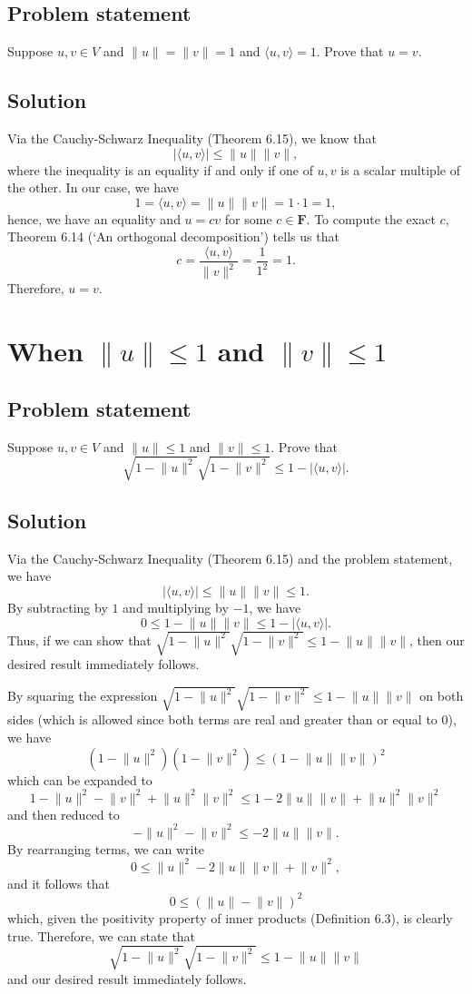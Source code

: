 \documentclass{article}
\providecommand{\abs}[1]{\lvert#1\rvert} \providecommand{\norm}[1]{\lVert#1\rVert}
\begin{document}
\subsection*{Problem statement}
Suppose $u,v\in V$ and $\norm{u}=\norm{v}=1$ and $\langle u,v\rangle=1$. 
Prove that $u=v$.

\subsection*{Solution}
Via the Cauchy-Schwarz Inequality (Theorem 6.15), we know that
\[\abs{\langle u,v\rangle}\leq\norm{u}\norm{v},\]
where the inequality is an equality if and only if one of $u,v$ is a scalar multiple of the other. 
In our case, we have
\[1=\langle u,v\rangle = \norm{u}\norm{v}=1\cdot 1=1,\]
hence, we have an equality and $u=cv$ for some $c\in\mathbf{F}$. 
To compute the exact $c$, Theorem 6.14 (`An orthogonal decomposition') tells us that 
\[c=\frac{\langle u,v\rangle}{\norm{v}^2}=\frac{1}{1^2}=1.\]
Therefore, $u=v$.

\clearpage

\section{When $\norm{u}\leq 1$ and $\norm{v}\leq 1$}
\subsection*{Problem statement}
Suppose $u,v\in V$ and $\norm{u}\leq 1$ and $\norm{v}\leq 1$. 
Prove that
\[\sqrt{1-\norm{u}^2}\sqrt{1-\norm{v}^2}\leq 1-\abs{\langle u,v \rangle}.\]

\subsection*{Solution}
Via the Cauchy-Schwarz Inequality (Theorem 6.15) and the problem statement, we have
\[\abs{\langle u,v\rangle}\leq \norm{u}\norm{v}\leq 1.\]
By subtracting by $1$ and multiplying by $-1$, we have
\[0\leq 1-\norm{u}\norm{v}\leq 1- \abs{\langle u,v\rangle}.\]
Thus, if we can show that $\sqrt{1-\norm{u}^2}\sqrt{1-\norm{v}^2}\leq1-\norm{u}\norm{v}$, then our desired result immediately follows.

By squaring the expression $\sqrt{1-\norm{u}^2}\sqrt{1-\norm{v}^2}\leq 1-\norm{u}\norm{v}$ on both sides (which is allowed since both terms are real and greater than or equal to $0$), we have
\[(1-\norm{u}^2)(1-\norm{v}^2)\leq (1-\norm{u}\norm{v})^2\]
which can be expanded to
\[1-\norm{u}^2-\norm{v}^2+\norm{u}^2\norm{v}^2\leq 1-2\norm{u}\norm{v}+\norm{u}^2\norm{v}^2\]
and then reduced to
\[-\norm{u}^2-\norm{v}^2 \leq -2\norm{u}\norm{v}.\]
By rearranging terms, we can write
\[0\leq \norm{u}^2 - 2\norm{u}\norm{v} + \norm{v}^2,\]
and it follows that
\[0\leq (\norm{u} - \norm{v})^2\]
which, given the positivity property of inner products (Definition 6.3), is clearly true. 
Therefore, we can state that 
\[\sqrt{1-\norm{u}^2}\sqrt{1-\norm{v}^2}\leq 1-\norm{u}\norm{v}\]
and our desired result immediately follows.
\end{document}

